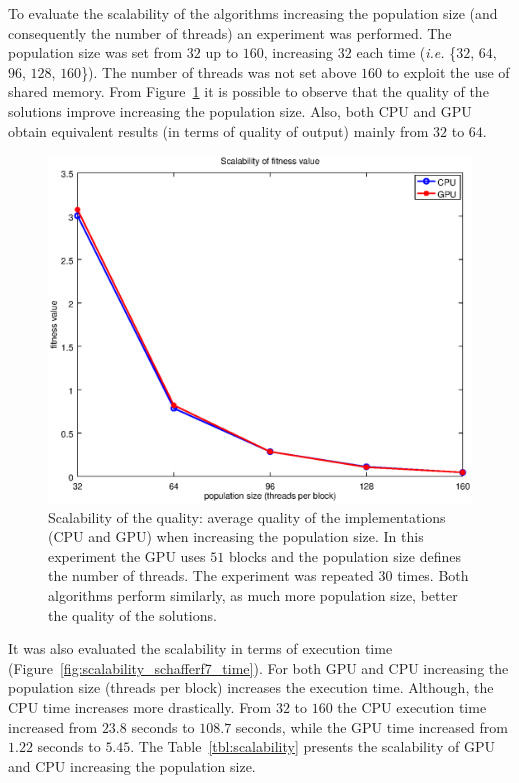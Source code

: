\documentclass{article}
\begin{document}
    To evaluate the scalability of the algorithms increasing the population size (and consequently the number of threads) an experiment was performed.
    The population size was set from $32$ up to $160$, increasing $32$ each time ({\it i.e.} \{$32$, $64$, $96$, $128$, $160$\}). The number of threads was not set above $160$ to exploit the use of shared memory. From Figure~\ref{fig:scalability_schafferf7} it is possible to observe that the quality of the solutions improve increasing the population size. Also, both CPU and GPU obtain equivalent results (in terms of quality of output) mainly from $32$ to $64$.

    \begin{figure}[!htb]
        \centering
        \includegraphics[width=.7\textwidth]{../img/scalability_schafferf7.eps}
        \caption{Scalability of the quality: average quality of the implementations (CPU and GPU) when increasing the population size. In this experiment the GPU uses $51$ blocks and the population size defines the number of threads. The experiment was repeated $30$ times. Both algorithms perform similarly, as much more population size, better the quality of the solutions.}
        \label{fig:scalability_schafferf7}
    \end{figure}

    It was also evaluated the scalability in terms of execution time (Figure~\ref{fig:scalability_schafferf7_time}).
    For both GPU and CPU increasing the population size (threads per block) increases the execution time.
    Although, the CPU time increases more drastically. From $32$ to $160$ the CPU execution time increased from $23.8$ seconds to $108.7$ seconds, while the GPU time increased from $1.22$ seconds to $5.45$. The Table~\ref{tbl:scalability} presents the scalability of GPU and CPU increasing the population size. 
\end{document}
